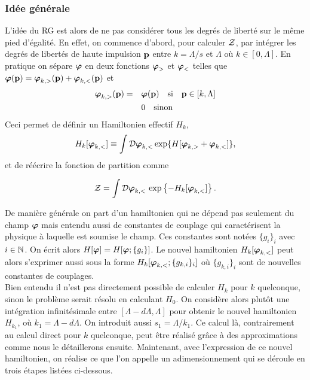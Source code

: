 \documentclass[10pt]{article}
\begin{document}
\begin{multicols}{2}
\subsubsection{Idée générale}

\label{sec:RG}

L'idée du RG est alors de ne pas considérer tous les degrés de liberté sur le même pied d'égalité. En effet, on commence d'abord, pour calculer $\mathcal{Z}$, par intégrer les degrés de libertés de haute impulsion ${\bf p}$ entre $k = \Lambda/s$ et $\Lambda$ où $k \in [0,\Lambda]$. En pratique on sépare $\boldsymbol{ \varphi}$ en deux fonctions $\boldsymbol{ \varphi}_>$ et $\boldsymbol{ \varphi}_<$ telles que $\boldsymbol{ \varphi}({\bf p}) = \boldsymbol{ \varphi}_{k,>}({\bf p}) + \boldsymbol{ \varphi}_{k,<}({\bf p})$ et
\begin{align}
	\boldsymbol{ \varphi}_{k,>}({\bf p})  = \quad & \boldsymbol{ \varphi}({\bf p}) \quad \text{si} \quad {\bf p} \in   [k,\Lambda] \\
	 & 0 \quad \text{sinon}
\end{align}
Ceci permet de définir un Hamiltonien effectif $H_k$, 
\begin{equation}
	H_k[\boldsymbol{ \varphi}_{k,<}] \equiv \int \mathcal{D} \boldsymbol{ \varphi}_{k,<}  \exp \{ H[\boldsymbol{ \varphi}_{k,>}+ \boldsymbol{ \varphi}_{k,<}] \},
\end{equation}
et de réécrire la fonction de partition comme 

\begin{equation}
\mathcal{Z} = \int \mathcal{D} \boldsymbol{ \varphi}_{k,<} \, \exp\left\{- H_k[\boldsymbol{ \varphi}_{k,<}]\right\}. 
\end{equation} 

De manière générale on part d'un hamiltonien qui ne dépend pas seulement du champ $\boldsymbol{ \varphi}$ mais entendu aussi de constantes de couplage qui caractérisent la physique à laquelle est soumise le champ. Ces constantes sont notées $\{g_i\}_i$ avec $i \in \mathbb{N}$. On écrit alors $H[\boldsymbol{ \varphi}] = H[\boldsymbol{ \varphi} ; \{g_i\}]$. Le nouvel hamiltonien $H_k[\boldsymbol{ \varphi}_{k,<}]$ peut alors s'exprimer aussi sous la forme $H_k[\boldsymbol{ \varphi}_{k,<} ; \{g_{k,i}\}_i]$ où $\{g_{k,i}\}_i$ sont de nouvelles constantes de couplages. \\

Bien entendu il n'est pas directement possible de calculer $H_k$ pour $k$ quelconque, sinon le problème serait résolu en calculant $H_0$. On considère alors plutôt une intégration infinitésimale entre $[\Lambda - d\Lambda, \Lambda]$ pour obtenir le nouvel hamiltonien $H_{k_1}$, où $k_1 = \Lambda - d\Lambda$. On introduit aussi $s_1 = \Lambda/k_1$. Ce calcul là, contrairement au calcul direct pour $k$ quelconque, peut être réalisé grâce à des approximations comme nous le détaillerons ensuite. Maintenant, avec l'expression de ce nouvel hamiltonien, on réalise ce que l'on appelle un adimensionnement qui se déroule en trois étapes listées ci-dessous.


\end{multicols}
\end{document}
